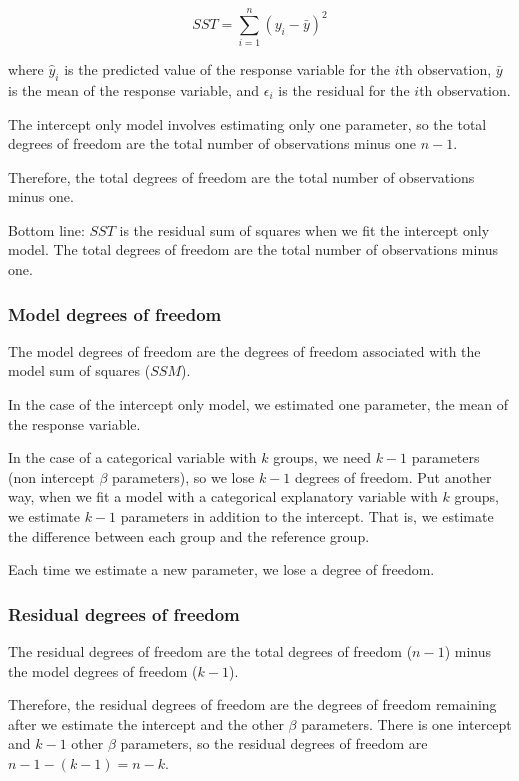 \documentclass[
  letterpaper,
  8pt,
  a4paper]{book}
\begin{document}
\[SST = \sum_{i=1}^n (y_i - \bar{y})^2\]

where \(\hat{y}_i\) is the predicted value of the response variable for
the \(i\)th observation, \(\bar{y}\) is the mean of the response
variable, and \(\epsilon_i\) is the residual for the \(i\)th
observation.

The intercept only model involves estimating only one parameter, so the
total degrees of freedom are the total number of observations minus one
\(n - 1\).

Therefore, the total degrees of freedom are the total number of
observations minus one.

Bottom line: \(SST\) is the residual sum of squares when we fit the
intercept only model. The total degrees of freedom are the total number
of observations minus one.

\subsubsection*{Model degrees of
freedom}\label{model-degrees-of-freedom}

The model degrees of freedom are the degrees of freedom associated with
the model sum of squares (\(SSM\)).

In the case of the intercept only model, we estimated one parameter, the
mean of the response variable.

In the case of a categorical variable with \(k\) groups, we need \(k-1\)
parameters (non intercept \(\beta\) parameters), so we lose \(k-1\)
degrees of freedom. Put another way, when we fit a model with a
categorical explanatory variable with \(k\) groups, we estimate \(k-1\)
parameters in addition to the intercept. That is, we estimate the
difference between each group and the reference group.

Each time we estimate a new parameter, we lose a degree of freedom.

\subsubsection*{Residual degrees of
freedom}\label{residual-degrees-of-freedom}

The residual degrees of freedom are the total degrees of freedom
(\(n-1\)) minus the model degrees of freedom (\(k-1\)).

Therefore, the residual degrees of freedom are the degrees of freedom
remaining after we estimate the intercept and the other \(\beta\)
parameters. There is one intercept and \(k-1\) other \(\beta\)
parameters, so the residual degrees of freedom are
\(n-1- ( k-1) = n - k\).
\end{document}
